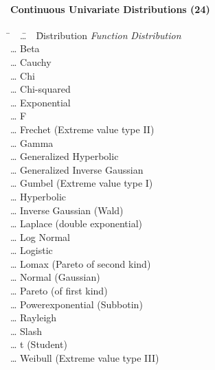 \paragraph{Continuous Univariate Distributions (24)}

\begin{tabbing}
	\hspace*{1em}
	\= ~~\=\ldots~~\=  Distribution \kill
	\> \emph{Function} \> \> \emph{Distribution} \\[1ex]
	\> 	\> \ldots \> Beta \\
	\> 	\> \ldots \> Cauchy \\
	\> 	\> \ldots \> Chi \\
	\> 	\> \ldots \> Chi-squared \\
	\> 	\> \ldots \> Exponential \\
	\> 	\> \ldots \> F \\
	\> 	\> \ldots \> Frechet (Extreme value type II) \\
	\> 	\> \ldots \> Gamma \\
	\> 	\> \ldots \> Generalized Hyperbolic \\
	\> 	\> \ldots \> Generalized Inverse Gaussian \\
	\> 	\> \ldots \> Gumbel (Extreme value type I) \\
	\> 	\> \ldots \> Hyperbolic \\
	\> 	\> \ldots \> Inverse Gaussian (Wald) \\
	\> 	\> \ldots \> Laplace (double exponential) \\
	\> 	\> \ldots \> Log Normal \\
	\> 	\> \ldots \> Logistic \\
	\> 	\> \ldots \> Lomax (Pareto of second kind) \\
	\> 	\> \ldots \> Normal (Gaussian) \\
	\> 	\> \ldots \> Pareto (of first kind) \\
	\> 	\> \ldots \> Powerexponential (Subbotin) \\
	\> 	\> \ldots \> Rayleigh \\
	\> 	\> \ldots \> Slash \\
	\> 	\> \ldots \> t (Student) \\
	\> 	\> \ldots \> Weibull (Extreme value type III) \\
\end{tabbing}

